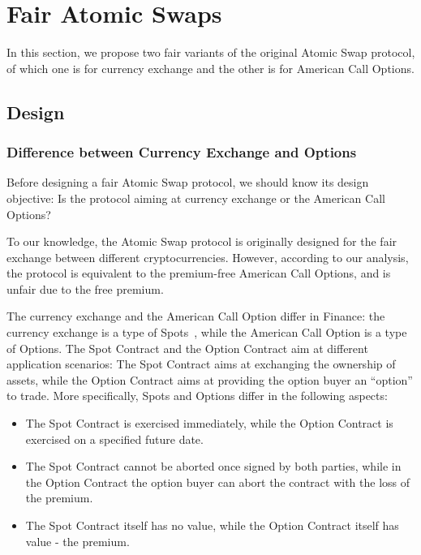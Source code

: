 \section{Fair Atomic Swaps}
\label{sec:fair_atomic_swap}

In this section, we propose two fair variants of the original Atomic Swap protocol, of which one is for currency exchange and the other is for American Call Options.




\subsection{Design}

\subsubsection{Difference between Currency Exchange and Options}
\label{subsubsec:diff_spot_option}

Before designing a fair Atomic Swap protocol, we should know its design objective:
Is the protocol aiming at currency exchange or the American Call Options?

To our knowledge, the Atomic Swap protocol is originally designed for the fair exchange between different cryptocurrencies.
However, according to our analysis, the protocol is equivalent to the premium-free American Call Options, and is unfair due to the free premium.

The currency exchange and the American Call Option differ in Finance: the currency exchange is a type of Spots~\cite{hull1991introduction}, while the American Call Option is a type of Options.
The Spot Contract and the Option Contract aim at different application scenarios: The Spot Contract aims at exchanging the ownership of assets, while the Option Contract aims at providing the option buyer an ``option'' to trade.
More specifically, Spots and Options differ in the following aspects:

\begin{itemize}
    \item The Spot Contract is exercised immediately, while the Option Contract is exercised on a specified future date.
    \item The Spot Contract cannot be aborted once signed by both parties, while in the Option Contract the option buyer can abort the contract with the loss of the premium.
    \item The Spot Contract itself has no value, while the Option Contract itself has value - the premium.
\end{itemize}

